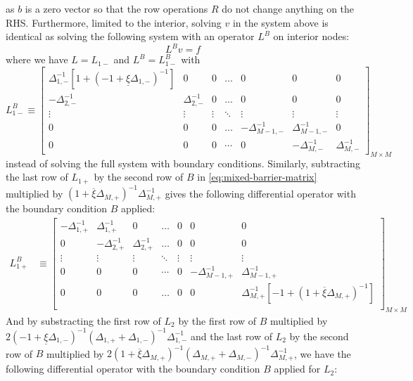 \documentclass[11pt]{article}
\theoremstyle{definition}
\begin{document}
as $b$ is a zero vector so that the row operations $R$ do not change anything on the RHS. Furthermore, limited to the interior, solving $v$ in the system above is identical as solving the following system with an operator $L^B$ on interior nodes:
\begin{equation}
L^B v = f
\end{equation}
where we have ${L} = {L}_{1-}$ and $L^B = L_{1-}^B$ with
\begin{equation}
L_{1-}^B \equiv \begin{bmatrix}
\Delta_{1,-}^{-1} [1 + (-1 + \underline{\xi} \Delta_{1,-})^{-1}] &0&0&\dots&0&0&0\\
-\Delta_{2,-}^{-1}&\Delta_{2,-}^{-1}&0&\dots&0&0&0\\
\vdots&\vdots&\vdots&\ddots&\vdots&\vdots&\vdots\\
0&0&0&\dots&-\Delta_{M-1,-}^{-1}&\Delta_{M-1,-}^{-1}&0\\
0&0&0&\cdots&0&-\Delta_{M,-}^{-1}&\Delta_{M,-}^{-1}
\end{bmatrix}_{M\times M}
\end{equation}
instead of solving the full system with boundary conditions. Similarly, subtracting the last row of $L_{1+}$ by the second row of $B$ in \eqref{eq:mixed-barrier-matrix} multiplied by $(1 + \overline{\xi} \Delta_{M,+})^{-1} \Delta_{M,+}^{-1}$ gives the following differential operator with the boundary condition $B$ applied:
\begin{align}
L_{1+}^B &\equiv \begin{bmatrix}
-\Delta_{1,+}^{-1}&\Delta_{1,+}^{-1}&0&\dots&0&0&0\\
0&-\Delta_{2,+}^{-1}&\Delta_{2,+}^{-1}&\dots&0&0&0\\
\vdots&\vdots&\vdots&\ddots&\vdots&\vdots&\vdots\\
0&0&0&\cdots&0&-\Delta_{M-1,+}^{-1}&\Delta_{M-1,+}^{-1}\\
0&0&0&\dots&0&0&\Delta_{M,+}^{-1}  [-1 + (1 + \overline{\xi} \Delta_{M,+})^{-1}]  \\
\end{bmatrix}_{M\times M}\label{eq:L-1-plus}
\end{align}
And by substracting the first row of $L_2$ by the first row of $B$ multiplied by $2(-1 + \underline{\xi} \Delta_{1,-} )^{-1} (\Delta_{1,+} + \Delta_{1,-})^{-1}  \Delta_{1,-}^{-1} $ and the last row of $L_2$ by the second row of $B$ multiplied by $2(1 + \overline{\xi} \Delta_{M,+} )^{-1} (\Delta_{M,+} + \Delta_{M,-})^{-1}  \Delta_{M,+}^{-1}$, we have the following differential operator with the boundary condition $B$ applied for $L_2$:
\end{document}
